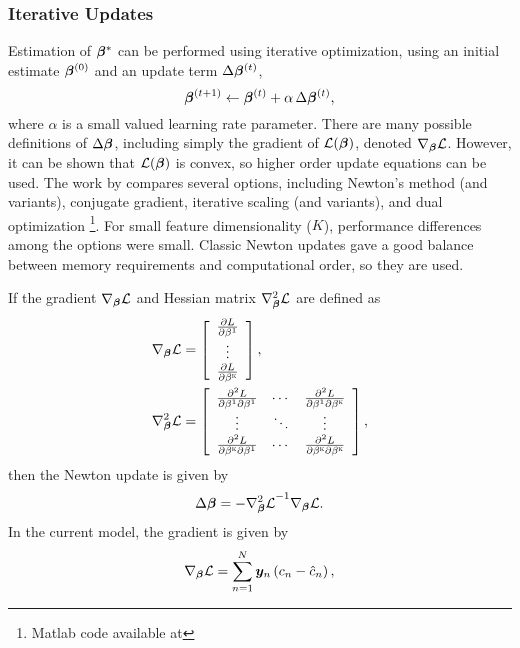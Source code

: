 \subsubsection{Iterative Updates}
Estimation of $\bm{\beta}^*$ can be performed using iterative optimization, using an initial estimate $\bm{\beta}^{(0)}$ and an update term $\Delta\bm{\beta}^{(t)}$,
\begin{equation}
\bm{\beta}^{(t+1)} \leftarrow \bm{\beta}^{(t)} + \alpha\thinspace\Delta\bm{\beta}^{(t)},
\label{eq:update}
\end{equation}
where $\alpha$ is a small valued learning rate parameter. There are many possible definitions of $\Delta\bm{\beta}$, including simply the gradient of $\mathcal{L}(\bm{\beta})$, denoted $\nabla_{\bm{\beta}}\mathcal{L}$. However, it can be shown that $\mathcal{L}(\bm{\beta})$ is convex, so higher order update equations can be used. The work by \citeauthor{Minka2003} \cite{Minka2003} compares several options, including Newton's method (and variants), conjugate gradient, iterative scaling (and variants), and dual optimization%
\footnote{Matlab code available at }.
For small feature dimensionality ($K$), performance differences among the options were small. Classic Newton updates gave a good balance between memory requirements and computational order, so they are used.
\par
If the gradient $\nabla_{\bm{\beta}}\mathcal{L}$ and Hessian matrix $\nabla^2_{\bm{\beta}}\mathcal{L}$ are defined as
\begin{align}
\nabla_{\bm{\beta}}\mathcal{L} &= \left[\begin{array}{c}
\frac{\partial L}{\partial\beta^1}\\\vdots\\\frac{\partial L}{\partial\beta^{\textsc{k}}}
\end{array}\right],\label{eq:llgradient0}\\
\nabla^2_{\bm{\beta}}\mathcal{L} &= \left[\begin{array}{ccc}
\frac{\partial^2 L}{\partial\beta^1\partial\beta^1}&\cdots&\frac{\partial^2 L}{\partial\beta^1\partial\beta^{\textsc{k}}}\\
\vdots&\ddots&\vdots\\
\frac{\partial^2 L}{\partial\beta^{\textsc{k}}\partial\beta^1}&\cdots&\frac{\partial^2 L}{\partial\beta^{\textsc{k}}\partial\beta^{\textsc{k}}}
\end{array}\right]\label{eq:llhessian0},
\end{align}
then the Newton update is given by
\begin{equation}
\Delta\bm{\beta} = -{\nabla^2_{\bm{\beta}}\mathcal{L}}^{-1}\nabla_{\bm{\beta}}\mathcal{L}.
\label{eq:newtonmle}
\end{equation}
In the current model, the gradient is given by 
\begin{equation}
\nabla_{\bm{\beta}}\mathcal{L} = \sum_{n=1}^{N} \bm{y}_n\left(c_n - \hat{c}_n\right),
\label{eq:llgradient}
\end{equation}

